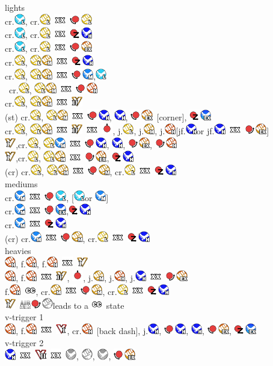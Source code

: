\documentclass[a4paper,8pt]{article}
\newcommand{\dragonpunch}{\includegraphics[height=1.3em]{dp}}
\newcommand{\qcf}{\includegraphics[height=1.3em]{qcf}}
\newcommand{\qcb}{\includegraphics[height=1.3em]{qcb}}
\newcommand{\up}{\includegraphics[height=1.3em]{up}}
\newcommand{\punch}{\includegraphics[height=1.3em]{punch}}
\newcommand{\lpunch}{\includegraphics[height=1.3em]{lpunch}}
\newcommand{\mpunch}{\includegraphics[height=1.3em]{mpunch}}
\newcommand{\hpunch}{\includegraphics[height=1.3em]{hpunch}}
\newcommand{\expunch}{\includegraphics[height=1.3em]{expunch}}
\newcommand{\kick}{\includegraphics[height=1.3em]{kick}}
\newcommand{\lkick}{\includegraphics[height=1.3em]{lkick}}
\newcommand{\mkick}{\includegraphics[height=1.3em]{mkick}}
\newcommand{\hkick}{\includegraphics[height=1.3em]{hkick}}
\newcommand{\exkick}{\includegraphics[height=1.3em]{exkick}}
\newcommand{\vsone}{\includegraphics[height=1.3em]{vskill1}}
\newcommand{\vstwo}{\includegraphics[height=1.3em]{vskill2}}
\newcommand{\vtone}{\includegraphics[height=1.3em]{vtrigger1}}
\newcommand{\vttwo}{\includegraphics[height=1.3em]{vtrigger2}}
\newcommand{\cancel}{\ \includegraphics[height=1.3em]{cancel}\ }
\newcommand{\crush}{\includegraphics[height=1.3em]{crush}}
\newcommand{\air}{\ \includegraphics[height=1.3em]{air}}
\begin{document}
\sffamily

\noindent
lights \\
cr.\lkick, cr.\lpunch\cancel\qcb\lpunch \\
cr.\lkick, cr.\lpunch\cancel\dragonpunch\hkick \\
cr.\lkick, cr.\lpunch\cancel\qcb\expunch \\
cr.\lpunch, \lpunch\mpunch\cancel\dragonpunch\hkick \\
cr.\lpunch, \lpunch\mpunch\cancel\qcb\mkick,\lkick \\\
cr.\lpunch, \lpunch\mpunch\cancel\qcb\hpunch \\
cr.\lpunch, \lpunch\mpunch\cancel\vstwo \\
(st) cr.\lpunch, \lpunch\mpunch\cancel\qcb\hkick, \hkick, \qcb\expunch\ [corner], \dragonpunch\exkick \\
cr.\lpunch, \lpunch\mpunch\cancel\vstwo\cancel\up, j.\lpunch, j.\mpunch, j.\hpunch [jf.\hkick or jf.\hkick\cancel\qcf\expunch] \\
\vsone,cr.\lpunch, \lpunch\mkick\cancel\qcb\hkick, \hkick, \qcf\expunch, \qcf\hpunch \\
\vsone,cr.\lpunch, \lpunch\mpunch\cancel\qcf\expunch, \dragonpunch\hkick \\
(cr) cr.\lpunch, \lpunch\mpunch\cancel\qcb\mpunch, cr.\lpunch\cancel\dragonpunch\hkick \\

\smallbreak
\noindent
mediums \\
cr.\mkick\cancel\qcb\lkick, [\lkick or \mkick] \\
cr.\mkick\cancel\qcb\exkick,\dragonpunch\hkick \\
cr.\mkick\cancel\dragonpunch\hkick \\
(cr) cr.\mkick\cancel\qcb\mpunch, cr.\lpunch\cancel\dragonpunch\hkick \\

\smallbreak
\noindent
heavies \\
\hpunch, f.\hpunch, f.\hpunch\cancel\vsone \\
\hpunch, f.\hpunch\cancel\vstwo, \up, j.\mpunch, j.\hpunch, j.\hkick\cancel\qcf\expunch \\
f.\hpunch\ \crush, cr.\mpunch\cancel\qcb\mpunch, cr.\lpunch\cancel\dragonpunch\hkick \\
\vsone\air\qcf\punch leads to a \crush\ state \\

\smallbreak
\noindent
v-trigger 1 \\
\hpunch, f.\hpunch\cancel\vtone, cr.\hpunch\ [back dash], j.\hkick, \qcb\hkick, \hkick, \qcb\expunch, \dragonpunch\exkick \\
v-trigger 2 \\
\hkick\cancel\vttwo\cancel\kick, \punch, \kick, \qcb\expunch \\
\end{document}

